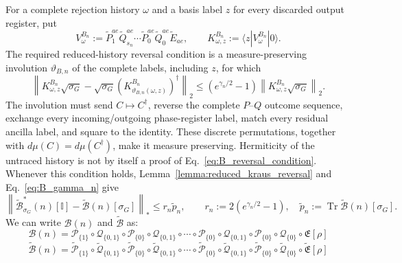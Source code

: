 \documentclass[aps,floatfix,10pt,amssymb,amsfont,amsmath,superscriptaddress,float,nofootinbib,longbibliography,nobalancelastpage,twocolumn]{revtex4-2}
\begin{document}
\begin{widetext}
For a complete rejection history $\omega$ and a basis label $z$ for every
discarded output register, put
\begin{equation*}
 V^{B_n}_\omega:=
 \tilde P^{ae}_1\tilde Q^{ae}_{s_n}\cdots
 \tilde P^{ae}_0\tilde Q^{ae}_{0}\tilde E_{ae},
 \qquad K^{B_n}_{\omega,z}:=\langle z|V^{B_n}_\omega|0\rangle .
\end{equation*}
The required reduced-history reversal condition is a measure-preserving
involution $\vartheta_{B,n}$ of the complete labels, including $z$, for
which
\begin{equation}
 \left\|K^{B_n}_{\omega,z}\sqrt{\sigma_G}
 -\sqrt{\sigma_G}
   (K^{B_n}_{\vartheta_{B,n}(\omega,z)})^\dagger\right\|_2
 \leq\left(e^{\gamma_n/2}-1\right)
 \left\|K^{B_n}_{\omega,z}\sqrt{\sigma_G}\right\|_2 .
 \label{eq:B_reversal_condition}
\end{equation}
The involution must send $C\mapsto C^\dagger$, reverse the complete
$P$--$Q$ outcome sequence, exchange every incoming/outgoing phase-register
label, match every residual ancilla label, and square to the identity.
These discrete permutations, together with
$d\mu(C)=d\mu(C^\dagger)$, make it measure preserving.  Hermiticity of the
untraced history is not by itself a proof of
Eq.~\eqref{eq:B_reversal_condition}. Whenever this condition holds,
Lemma~\ref{lemma:reduced_kraus_reversal} and
Eq.~\eqref{eq:B_gamma_n} give
\begin{equation}
 \left\|\tilde{\mathcal B}_{\sigma_G}^*(n)[\mathbb I]
 -\tilde{\mathcal B}(n)[\sigma_G]\right\|_*
 \leq r_n\tilde p_n,\qquad
 r_n:=2\left(e^{\gamma_n/2}-1\right),
 \quad
 \tilde p_n:=\operatorname{Tr}\tilde{\mathcal B}(n)[\sigma_G].
 \label{eq:B_direct_defect}
\end{equation}
We can write $\mathcal{B}(n)$ and $\tilde{\mathcal{B}}$ as:
\begin{equation}
    \mathcal{B}(n) = \mathcal{P}_{\{1\}}\circ\mathcal{Q}_{\{0,1\}}\circ\mathcal{P}_{\{0\}}\circ\mathcal{Q}_{\{0,1\}}\circ\cdots\circ\mathcal{P}_{\{0\}}\circ\mathcal{Q}_{\{0,1\}}\circ\mathcal{P}_{\{0\}}\circ\mathcal{Q}_{\{0\}}\circ\mathfrak{E}[\rho]
\end{equation}
\begin{equation}
    \tilde{\mathcal{B}}(n) = \tilde{\mathcal{P}}_{\{1\}}\circ\tilde {\mathcal{Q}}_{\{0,1\}}\circ\tilde{\mathcal{P}}_{\{0\}}\circ\tilde{\mathcal{Q}}_{\{0,1\}}\circ\cdots\circ\tilde{\mathcal{P}}_{\{0\}}\circ\tilde{\mathcal{Q}}_{\{0,1\}}\circ\tilde{\mathcal{P}}_{\{0\}}\circ\tilde{\mathcal{Q}}_{\{0\}}\circ\tilde{\mathfrak{E}}[\rho]
\end{equation}

\end{widetext}
\end{document}
